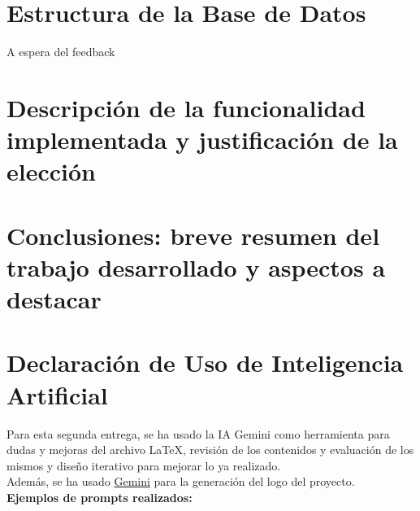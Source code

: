 \documentclass[10pt]{article}
\begin{document}
	
	\section{Estructura de la Base de Datos}
		A espera del feedback
	
	\section{Descripción de la funcionalidad implementada y justificación de la elección}
	
	
	\section{Conclusiones: breve resumen del trabajo desarrollado y aspectos a destacar}
	
	
	\section{Declaración de Uso de Inteligencia Artificial}
		Para esta segunda entrega, se ha usado la IA Gemini como herramienta para dudas y mejoras del archivo LaTeX, revisión de los contenidos y evaluación de los mismos y diseño iterativo para mejorar lo ya realizado.\\
		Además, se ha usado \href{https://gemini.google.com/share/7a923a0bfae8}{Gemini} para la generación del logo del proyecto.\\
		\textbf{Ejemplos de prompts realizados:}
\end{document}

